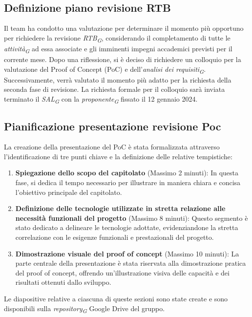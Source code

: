 \documentclass{article}
\begin{document}
\subsection{Definizione piano revisione RTB}
Il team ha condotto una valutazione per determinare il momento più opportuno per richiedere la revisione \textit{RTB}\textsubscript{\textit{G}}, considerando il completamento di tutte le \textit{attività}\textsubscript{\textit{G}} ad essa associate e gli imminenti impegni accademici previsti per il corrente mese.
Dopo una riflessione, si è deciso di richiedere un colloquio per la valutazione del Proof of Concept (PoC) e dell'\textit{analisi dei requisiti}\textsubscript{\textit{G}}. Successivamente, verrà valutato il momento più adatto per la richiesta della seconda fase di revisione.
La richiesta formale per il colloquio sarà inviata terminato il \textit{SAL}\textsubscript{\textit{G}} con la \textit{proponente}\textsubscript{\textit{G}} fissato il 12 gennaio 2024.

\subsection{Pianificazione presentazione revisione Poc}
La creazione della presentazione del PoC è stata formalizzata attraverso l'identificazione di tre punti chiave e la definizione delle relative tempistiche:

\begin{enumerate}
    \item \textbf{Spiegazione dello scopo del capitolato} (Massimo 2 minuti): In questa fase, si dedica il tempo necessario per illustrare in maniera chiara e concisa l'obiettivo principale del capitolato.
    
    \item \textbf{Definizione delle tecnologie utilizzate in stretta relazione alle necessità funzionali del progetto} (Massimo 8 minuti): Questo segmento è stato dedicato a delineare le tecnologie adottate, evidenziandone la stretta correlazione con le esigenze funzionali e prestazionali del progetto.
    
    \item \textbf{Dimostrazione visuale del proof of concept} (Massimo 10 minuti): La parte centrale della presentazione è stata riservata alla dimostrazione pratica del proof of concept, offrendo un'illustrazione visiva delle capacità e dei risultati ottenuti dallo sviluppo.
\end{enumerate}

Le diapositive relative a ciascuna di queste sezioni sono state create e sono disponibili sulla \textit{repository}\textsubscript{\textit{G}} Google Drive del gruppo.
\end{document}
